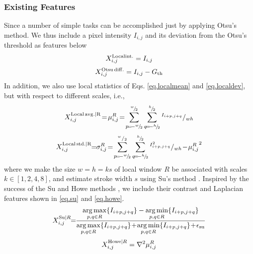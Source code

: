 \documentclass[onecolumn,11pt,draftcls,journal]{IEEEtran}
\DeclareMathOperator*{\argmin}{arg\,min}
\DeclareMathOperator*{\argmax}{arg\,max}
\begin{document}
\subsubsection{Existing Features}
Since a number of simple tasks can be accomplished just by applying Otsu's method. We thus include a pixel intensity $I_{i,j}$ and its deviation from the Otsu's threshold as features below
\begin{equation}
X_{i,j}^{\rm{Local int.}} = I_{i,j}
\end{equation}
\begin{equation}
X_{i,j}^{\rm{Otsu\,diff.}} = I_{i,j} - G_{\rm{th}}
\end{equation}
In addition, we also use local statistics of Eqs. \eqref{eq.localmean} and \eqref{eq.localdev}, but with respect to different scales, i.e.,
\begin{equation}\label{eq.localmean}
X_{i,j}^{\rm{Local\,avg.}|R}\!=\!\mu_{i,j}^{R}\!=\!\sum_{p\!=\!-^{w}\!/\!_{2}}^{^{w}\!/\!_{2}}\sum_{q\!=\!-^{h}\!/\!_{2}}^{^{h}\!/\!_{2}}{^{I_{i+p,j+q}}/_{wh}}
\end{equation}
\begin{equation}\label{eq.localdev}
X_{i,j}^{\rm{Local\,std.}|R} \!\!=\!\!\sigma_{i,j}^{R}\!=\!\sum_{p\!=\!-^{w}\!/\!_{2}}^{^{w}/_{2}}\sum_{q\!=\!-^{h}\!/\!_{2}}^{^{h}\!/\!_{2}}{^{I_{i+p,j+q}^2}/_{ wh}} \!-\!{\mu^R_{i,j}}^2
\end{equation}
where we make the size $w\!\!=\!\!h\!\!=\!\!ks$  of local window $R$ be associated with scales $k\in[1,2,4,8]$, and estimate stroke width $s$ using Su's method \cite{Su2013}. Inspired by the success of the Su \cite{Su2009,Su2013} and Howe methods \cite{Howe2011,Howe2013}, we include their contrast and Laplacian features shown in \eqref{eq.su} and \eqref{eq.howe}. %
\begin{equation}
X_{i,j}^{{\rm{Su}}|R}\!\!=\!\!{{\displaystyle\argmax_{p,q\in R}\{I_{i+p,j+q}\}-\displaystyle\argmin_{p,q\in R}\{I_{i+p,j+q}\}}\over{{\displaystyle\argmax_{p,q\in R}\{I_{i+p,j+q}\}\!+\!\displaystyle\argmin_{p,q\in R}\{I_{i+p,j+q}\}}}\!+\!\epsilon_{\rm{su}}}
\label{eq.su}
\end{equation}
\begin{equation}
X_{i,j}^{{\rm{Howe}}|R}=\nabla^2\mu_{i,j}^{R}
\label{eq.howe}
\end{equation}
\end{document}
